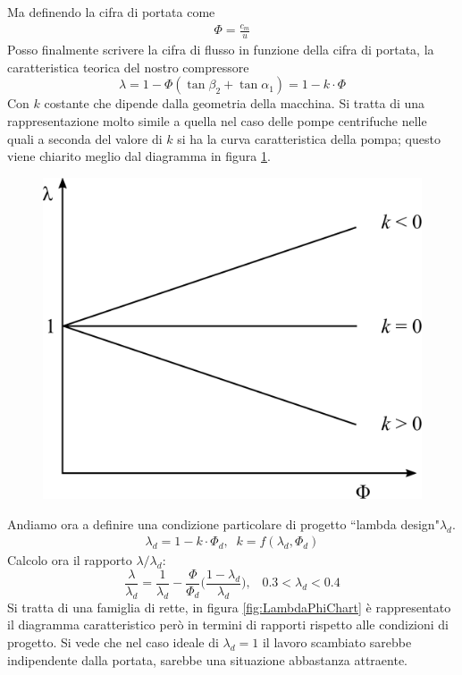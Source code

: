 Ma definendo  la cifra di portata come
\begin{align*}
\Phi = \frac{c_m}{u}
\end{align*}
Posso finalmente scrivere la cifra di flusso in funzione della cifra di portata, la caratteristica teorica del nostro compressore
\begin{equation}
\lambda = 1 - \Phi \left( \tan \beta_2 + \tan \alpha_1 \right) = 1 - k \cdot \Phi
\end{equation}
Con $k$ costante che dipende dalla geometria della macchina. Si tratta di una rappresentazione molto simile a quella nel caso delle pompe centrifuche nelle quali a seconda del valore di $k$ si ha la curva caratteristica della pompa; questo viene chiarito meglio dal diagramma in figura \ref{fig:CondProg}.
\begin{figure}
\centering
  \includegraphics[width=.4\textwidth]{fig/CondProg.pdf}
\caption{}
\label{fig:CondProg}
\end{figure}
Andiamo ora a definire una condizione particolare di progetto ``lambda design"$\lambda_d$.
\begin{align*}
\lambda_d = 1 - k \cdot \Phi_d, \;\; k = f(\lambda_d,\Phi_d)
\end{align*}
Calcolo ora il rapporto $\lambda/\lambda_d$:
\begin{equation} \label{eq:lambdad}
\frac{\lambda}{\lambda_d} = \frac{1}{\lambda_d} - \frac{\Phi}{\Phi_d} \Bigg( \frac{1-\lambda_d}{\lambda_d} \Bigg), \;\;\; 0.3 < \lambda_d < 0.4
\end{equation}
Si tratta di una famiglia di rette, in figura \ref{fig:LambdaPhiChart} è rappresentato il diagramma caratteristico però in termini di rapporti rispetto alle condizioni di progetto. Si vede che nel caso ideale di $\lambda_d = 1$ il lavoro scambiato sarebbe indipendente dalla portata, sarebbe una situazione abbastanza attraente. 
